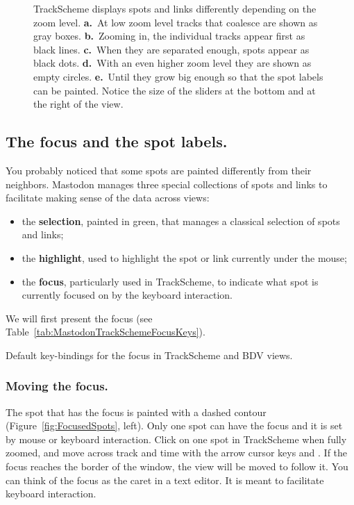 \begin{figure}
    \caption{TrackScheme displays spots and links differently depending on the zoom level. \textbf{a.}~At low zoom level tracks that coalesce are shown as gray boxes. \textbf{b.}~Zooming in, the individual tracks appear first as black lines. \textbf{c.}~When they are separated enough, spots appear as black dots. \textbf{d.}~With an even higher zoom level they are shown as empty circles. \textbf{e.}~Until they grow big enough so that the spot labels can be painted. Notice the size of the sliders at the bottom and at the right of the view.}
    \label{fig:TrackSchemeZoomLevel}
\end{figure}  

\subsection{The focus and the spot labels.}

You probably noticed that some spots are painted differently from their neighbors. 
Mastodon manages three special collections of spots and links to facilitate making sense of the data across views:
\begin{itemize}
    \item the \textbf{selection}, painted in green, that manages a classical selection of spots and links;
    \item the \textbf{highlight}, used to highlight the spot or link currently under the mouse;
    \item the \textbf{focus}, particularly used in TrackScheme, to indicate what spot is currently focused on by the keyboard interaction.
\end{itemize}

\noindent We will first present the focus (see Table~\ref{tab:MastodonTrackSchemeFocusKeys}). 

\begin{table}[htbp]
    \centering
    \caption{Default key-bindings for the focus in TrackScheme and BDV views.}
    
    \label{tab:MastodonTrackSchemeFocusKeys}
\end{table}


\subsubsection{Moving the focus.}

The spot that has the focus is painted with a dashed contour (Figure~\ref{fig:FocusedSpots}, left). 
Only one spot can have the focus and it is set by mouse or keyboard interaction.
Click on one spot in TrackScheme when fully zoomed, and move across track and time with the arrow cursor keys \keys{\arrowkeyleft} \keys{\arrowkeyright} \keys{\arrowkeyup} and \keys{\arrowkeydown}.
If the focus reaches the border of the window, the view will be moved to follow it.
You can think of the focus as the caret in a text editor. 
It is meant to facilitate keyboard interaction.

